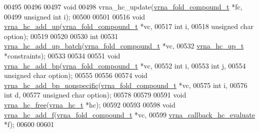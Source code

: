 \begin{DoxyCode}
00495 
00496 
00497 \textcolor{keywordtype}{void}
00498 vrna\_hc\_update(\hyperlink{group__fold__compound_structvrna__fc__s}{vrna\_fold\_compound\_t} *fc,
00499                \textcolor{keywordtype}{unsigned} \textcolor{keywordtype}{int}         i);
00500 
00501 
00516 \textcolor{keywordtype}{void} \hyperlink{group__hard__constraints_ga447d88e06ad97bb225cd83310ace8345}{vrna\_hc\_add\_up}(\hyperlink{group__fold__compound_structvrna__fc__s}{vrna\_fold\_compound\_t}  *vc,
00517                     \textcolor{keywordtype}{int}                   i,
00518                     \textcolor{keywordtype}{unsigned} \textcolor{keywordtype}{char}         option);
00519 
00520 
00530 \textcolor{keywordtype}{int}
00531 \hyperlink{group__hard__constraints_ga5070f296c8af2baea10951525519464f}{vrna\_hc\_add\_up\_batch}(\hyperlink{group__fold__compound_structvrna__fc__s}{vrna\_fold\_compound\_t} *vc,
00532                      \hyperlink{group__hard__constraints_structvrna__hc__up__s}{vrna\_hc\_up\_t}         *constraints);
00533 
00534 
00551 \textcolor{keywordtype}{void} \hyperlink{group__hard__constraints_ga7cba95ebe2ceb5ec9a5768f2232854fd}{vrna\_hc\_add\_bp}(\hyperlink{group__fold__compound_structvrna__fc__s}{vrna\_fold\_compound\_t}  *vc,
00552                     \textcolor{keywordtype}{int}                   i,
00553                     \textcolor{keywordtype}{int}                   j,
00554                     \textcolor{keywordtype}{unsigned} \textcolor{keywordtype}{char}         option);
00555 
00556 
00574 \textcolor{keywordtype}{void} \hyperlink{group__hard__constraints_gaed50398ade2d4852c9e82592fe76046c}{vrna\_hc\_add\_bp\_nonspecific}(\hyperlink{group__fold__compound_structvrna__fc__s}{vrna\_fold\_compound\_t}  *vc,
00575                                 \textcolor{keywordtype}{int}                   i,
00576                                 \textcolor{keywordtype}{int}                   d,
00577                                 \textcolor{keywordtype}{unsigned} \textcolor{keywordtype}{char}         option);
00578 
00579 
00591 \textcolor{keywordtype}{void} \hyperlink{group__hard__constraints_ga696dcf77887d856c6f21ea266d8b9ca2}{vrna\_hc\_free}(\hyperlink{group__hard__constraints_structvrna__hc__s}{vrna\_hc\_t} *hc);
00592 
00593 
00598 \textcolor{keywordtype}{void} \hyperlink{hard_8h_af220427ba7ecc8e786a07b7799658f18}{vrna\_hc\_add\_f}(\hyperlink{group__fold__compound_structvrna__fc__s}{vrna\_fold\_compound\_t}       *vc,
00599                    \hyperlink{group__hard__constraints_gae465f1d4a3d8b6592b38ecbb0d9f613d}{vrna\_callback\_hc\_evaluate}  *f);
00600 
00601 

\end{DoxyCode}
